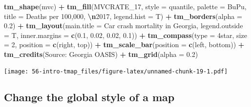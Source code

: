 \documentclass[
]{book}
\newenvironment{Shaded}{\begin{snugshade}}{\end{snugshade}}
\newcommand{\AttributeTok}[1]{\textcolor[rgb]{0.13,0.29,0.53}{#1}}
\newcommand{\DecValTok}[1]{\textcolor[rgb]{0.00,0.00,0.81}{#1}}
\newcommand{\FloatTok}[1]{\textcolor[rgb]{0.00,0.00,0.81}{#1}}
\newcommand{\FunctionTok}[1]{\textcolor[rgb]{0.13,0.29,0.53}{\textbf{#1}}}
\newcommand{\NormalTok}[1]{#1}
\newcommand{\SpecialCharTok}[1]{\textcolor[rgb]{0.81,0.36,0.00}{\textbf{#1}}}
\newcommand{\StringTok}[1]{\textcolor[rgb]{0.31,0.60,0.02}{#1}}
\begin{document}
\begin{Shaded}
\begin{Highlighting}[]
\FunctionTok{tm\_shape}\NormalTok{(mvc) }\SpecialCharTok{+}
  \FunctionTok{tm\_fill}\NormalTok{(}\StringTok{\textquotesingle{}MVCRATE\_17\textquotesingle{}}\NormalTok{,}
          \AttributeTok{style =} \StringTok{\textquotesingle{}quantile\textquotesingle{}}\NormalTok{,}
          \AttributeTok{palette =} \StringTok{\textquotesingle{}BuPu\textquotesingle{}}\NormalTok{,}
          \AttributeTok{title =} \StringTok{\textquotesingle{}Deaths per 100,000, }\SpecialCharTok{\textbackslash{}n}\StringTok{2017\textquotesingle{}}\NormalTok{,}
          \AttributeTok{legend.hist =}\NormalTok{ T) }\SpecialCharTok{+}
  \FunctionTok{tm\_borders}\NormalTok{(}\AttributeTok{alpha =} \FloatTok{0.2}\NormalTok{) }\SpecialCharTok{+}
  \FunctionTok{tm\_layout}\NormalTok{(}\AttributeTok{main.title =} \StringTok{\textquotesingle{}Car crash mortality in Georgia\textquotesingle{}}\NormalTok{,}
            \AttributeTok{legend.outside =}\NormalTok{ T, }
            \AttributeTok{inner.margins =} \FunctionTok{c}\NormalTok{(}\FloatTok{0.1}\NormalTok{, }\FloatTok{0.02}\NormalTok{, }\FloatTok{0.02}\NormalTok{, }\FloatTok{0.1}\NormalTok{)) }\SpecialCharTok{+}
  \FunctionTok{tm\_compass}\NormalTok{(}\AttributeTok{type =} \StringTok{\textquotesingle{}4star\textquotesingle{}}\NormalTok{, }
             \AttributeTok{size =} \DecValTok{2}\NormalTok{,}
             \AttributeTok{position =} \FunctionTok{c}\NormalTok{(}\StringTok{\textquotesingle{}right\textquotesingle{}}\NormalTok{, }\StringTok{\textquotesingle{}top\textquotesingle{}}\NormalTok{)) }\SpecialCharTok{+}
  \FunctionTok{tm\_scale\_bar}\NormalTok{(}\AttributeTok{position =} \FunctionTok{c}\NormalTok{(}\StringTok{\textquotesingle{}left\textquotesingle{}}\NormalTok{, }\StringTok{\textquotesingle{}bottom\textquotesingle{}}\NormalTok{)) }\SpecialCharTok{+}
  \FunctionTok{tm\_credits}\NormalTok{(}\StringTok{\textquotesingle{}Source: Georgia OASIS\textquotesingle{}}\NormalTok{) }\SpecialCharTok{+}
  \FunctionTok{tm\_grid}\NormalTok{(}\AttributeTok{alpha =} \FloatTok{0.2}\NormalTok{)}
\end{Highlighting}
\end{Shaded}

\texttt{[image: 56-intro-tmap\_files/figure-latex/unnamed-chunk-19-1.pdf]}

\hypertarget{change-the-global-style-of-a-map}{%
\subsection{Change the global style of a map}\label{change-the-global-style-of-a-map}}
\end{document}
